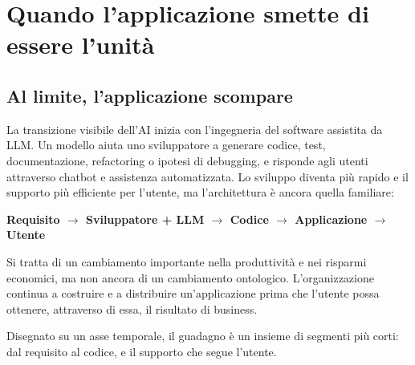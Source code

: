 \documentclass[10pt,oneside,openany]{book}
\begin{document}
\part{Quando l'applicazione smette di essere l'unità}

\chapter{Al limite, l'applicazione scompare}

La transizione visibile dell'AI inizia con l'ingegneria del software assistita da LLM. Un modello aiuta uno sviluppatore a generare codice, test, documentazione, refactoring o ipotesi di debugging, e risponde agli utenti attraverso chatbot e assistenza automatizzata. Lo sviluppo diventa più rapido e il supporto più efficiente per l'utente, ma l'architettura è ancora quella familiare:

\begin{center}
\sffamily\bfseries
Requisito $\rightarrow$ Sviluppatore + LLM $\rightarrow$ Codice $\rightarrow$ Applicazione $\rightarrow$ Utente
\end{center}

Si tratta di un cambiamento importante nella produttività e nei risparmi economici, ma non ancora di un cambiamento ontologico. L'organizzazione continua a costruire e a distribuire un'applicazione prima che l'utente possa ottenere, attraverso di essa, il risultato di business.

Disegnato su un asse temporale, il guadagno è un insieme di segmenti più corti: dal requisito al codice, e il supporto che segue l'utente.
\end{document}
